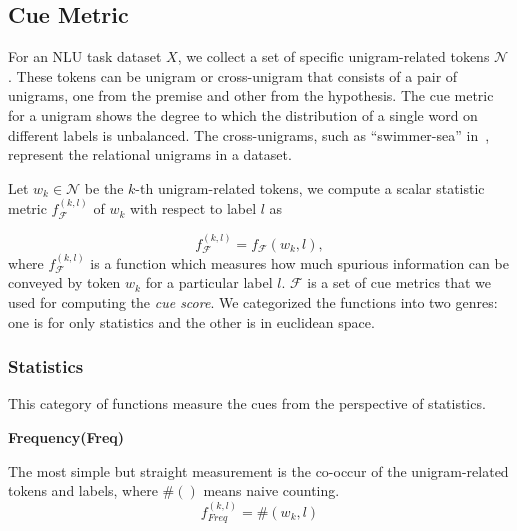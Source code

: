\subsection{Cue Metric}

For an NLU task dataset $X$, we collect a set of specific unigram-related tokens $\mathcal{N}$. These 
tokens can be unigram or cross-unigram that consists of a pair of
unigrams, one from the premise and other from the hypothesis.
The cue metric for a unigram
shows the degree to which the distribution of a single word on 
 different labels is unbalanced. 
The cross-unigrams, such as  ``swimmer-sea'' in~, 
represent the 
relational unigrams in a dataset. 

Let $w_k \in \mathcal{N}$ be the $k$-th unigram-related tokens, we compute a scalar statistic metric $f_{\mathcal{F}}^{(k,l)}$ of $w_k$ with respect to label $l$ as

\begin{equation}
    f_{\mathcal{F}}^{(k,l)} = f_{\mathcal{F}}(w_k, l),    
\end{equation}
where $f_{\mathcal{F}}^{(k,l)}$ is a function which measures how much spurious information can be conveyed by token $w_k$ for a particular label $l$. 
$\mathcal{F}$ is a set of cue metrics that we used for computing the \textit{cue score}. We categorized the functions into two
genres: one is for only statistics and the other is in euclidean space.

\subsubsection{Statistics}
This category of functions measure the cues from the perspective of statistics.

\noindent\textbf{Frequency(Freq)}

The most simple but straight measurement is the co-occur of the 
unigram-related tokens and labels, where $\#()$ means naive counting.
\begin{equation}
    f_{Freq}^{(k,l)} = \#(w_k, l)
\end{equation}

